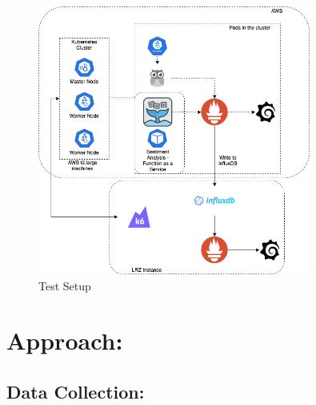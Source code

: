 \begin{figure}[htpb]
  \centering
  \includegraphics[width=0.8\textwidth]{figures/testSetup}
  \caption{Test Setup} \label{fig:testSetup}
\end{figure}

\newpage 

\section{Approach:}

\subsection{Data Collection:}

